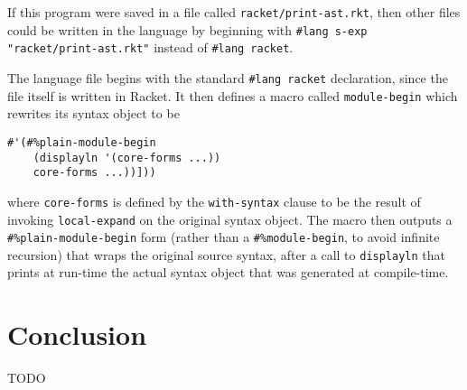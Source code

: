 \documentclass{article}
\begin{document}
If this program were saved in a file called \texttt{racket/print-ast.rkt}, then other files could be written in the language by beginning with \texttt{\#lang s-exp "racket/print-ast.rkt"} instead of \texttt{\#lang racket}.

The language file begins with the standard \texttt{\#lang racket} declaration, since the file itself is written in Racket. It then defines a macro called \texttt{module-begin} which rewrites its syntax object to be

\begin{lstlisting}
#'(#%plain-module-begin
    (displayln '(core-forms ...))
    core-forms ...))]))
\end{lstlisting}

where \texttt{core-forms} is defined by the \texttt{with-syntax} clause to be the result of invoking \texttt{local-expand} on the original syntax object. The macro then outputs a \texttt{\#\%plain-module-begin} form (rather than a \texttt{\#\%module-begin}, to avoid infinite recursion) that wraps the original source syntax, after a call to \texttt{displayln} that prints at run-time the actual syntax object that was generated at compile-time.



\section{Conclusion}
TODO
\end{document}
